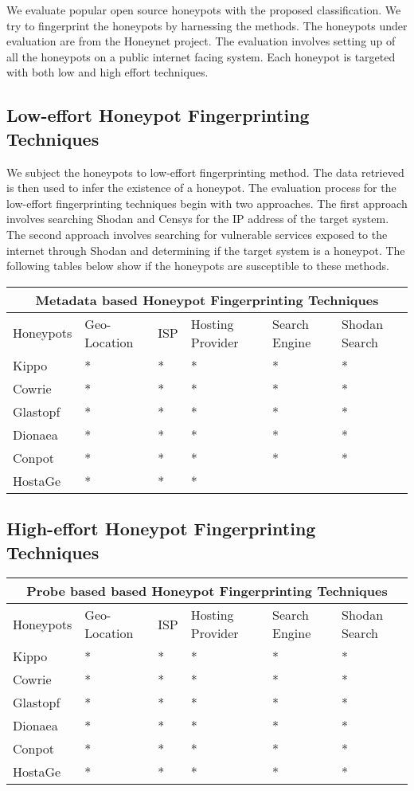 \documentclass[../main.tex]{subfiles}
\begin{document}
We evaluate popular open source honeypots with the proposed classification. We try to fingerprint the honeypots by harnessing the methods. The honeypots under evaluation are from the Honeynet project. The evaluation involves setting up of all the honeypots on a public internet facing system. Each honeypot is targeted with both low and high effort techniques. 
 
\subsection{Low-effort Honeypot Fingerprinting Techniques}
 We subject the honeypots to low-effort fingerprinting method. The data retrieved is then used to infer the existence of a honeypot. The evaluation process for the low-effort fingerprinting techniques begin with two approaches. The first approach involves searching Shodan and Censys for the IP address of the target system. The second approach involves searching for vulnerable services exposed to the internet through Shodan and determining if the target system is a honeypot. The following tables below show if the honeypots are susceptible to these methods. 
 
 \begin{tabular}{ |p{1.5cm}||p{1.2cm}|p{0.4cm}|p{1.2cm}|p{1.2cm}|p{1.2cm}| }
 \hline
 \multicolumn{6}{|c|}{Metadata based Honeypot Fingerprinting Techniques} \\
 \hline
 Honeypots & Geo-Location & ISP & Hosting Provider & Search Engine & Shodan Search\\
 \hline
 Kippo   & *  &* & * & * & * \\
 Cowrie  & *  &* & * & * & * \\
 Glastopf& *  &* & * & * & * \\
 Dionaea & *  &* & * & * & * \\
 Conpot  & *  &* & * & * & * \\
 HostaGe & *  &* & * &   &   \\
 \hline
\end{tabular}




\subsection{High-effort Honeypot Fingerprinting Techniques}



\begin{tabular}{ |p{1.5cm}||p{1.2cm}|p{0.4cm}|p{1.2cm}|p{1.2cm}|p{1.2cm}| }
 \hline
 \multicolumn{6}{|c|}{Probe based based Honeypot Fingerprinting Techniques} \\
 \hline
 Honeypots & Geo-Location & ISP & Hosting Provider & Search Engine & Shodan Search\\
 \hline
 Kippo   & *  &* & * & * & * \\
 Cowrie  & *  &* & * & * & * \\
 Glastopf& *  &* & * & * & * \\
 Dionaea & *  &* & * & * & * \\
 Conpot  & *  &* & * & * & * \\
 HostaGe & *  &* & * & * & * \\
 \hline
\end{tabular}
\end{document}
